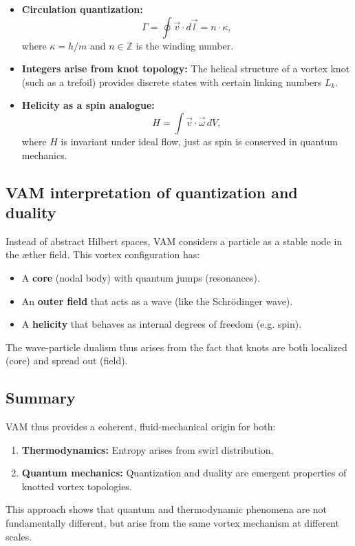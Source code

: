 \begin{itemize}
    \item \textbf{Circulation quantization:}
    \begin{equation}
        \Gamma = \oint \vec{v} \cdot d\vec{l} = n \cdot \kappa,
    \end{equation}
    where $\kappa = h/m$ and $n \in \mathbb{Z}$ is the winding number.
    \item \textbf{Integers arise from knot topology:} The helical structure of a vortex knot (such as a trefoil) provides discrete states with certain linking numbers $L_k$.
    \item \textbf{Helicity as a spin analogue:}
    \begin{equation}
        H = \int \vec{v} \cdot \vec{\omega} \, dV,
    \end{equation}
    where $H$ is invariant under ideal flow, just as spin is conserved in quantum mechanics.
\end{itemize}

\subsection{VAM interpretation of quantization and duality}

Instead of abstract Hilbert spaces, VAM considers a particle as a stable node in the æther field. This vortex configuration has:

\begin{itemize}
    \item A \textbf{core} (nodal body) with quantum jumps (resonances).
    \item An \textbf{outer field} that acts as a wave (like the Schrödinger wave).

    \item A \textbf{helicity} that behaves as internal degrees of freedom (e.g. spin).
\end{itemize}

The wave-particle dualism thus arises from the fact that knots are both localized (core) and spread out (field).

\subsection{Summary}

VAM thus provides a coherent, fluid-mechanical origin for both:

\begin{enumerate}
    \item \textbf{Thermodynamics:} Entropy arises from swirl distribution.
    \item \textbf{Quantum mechanics:} Quantization and duality are emergent properties of knotted vortex topologies.
\end{enumerate}

This approach shows that quantum and thermodynamic phenomena are not fundamentally different, but arise from the same vortex mechanism at different scales.